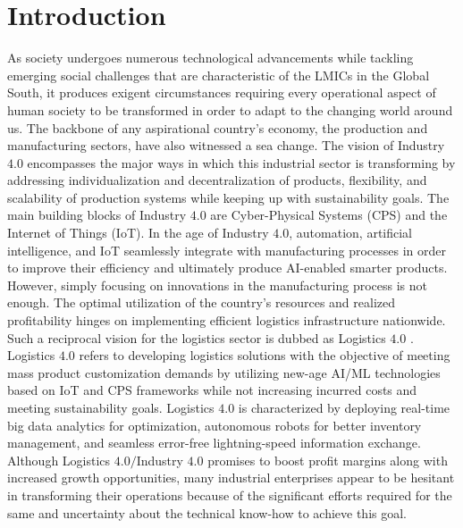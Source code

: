 \documentclass[paper=a4wide, fontsize=12pt]{scrartcl}	 %
\begin{document}
\section*{Introduction}

As society undergoes numerous technological advancements while tackling emerging social challenges that are characteristic of the LMICs in the Global South, it produces exigent circumstances requiring every operational aspect of human society to be transformed in order to adapt to the changing world around us. The backbone of any aspirational country's economy, the production and manufacturing sectors, have also witnessed a sea change. The vision of Industry $4.0$ encompasses the major ways in which this industrial sector is transforming by addressing individualization and decentralization of products, flexibility, and scalability of production systems while keeping up with sustainability goals. The main building blocks of Industry $4.0$ are Cyber-Physical Systems (CPS) and the Internet of Things (IoT). In the age of Industry $4.0$, automation, artificial intelligence, and IoT seamlessly integrate with manufacturing processes in order to improve their efficiency and ultimately produce AI-enabled smarter products. \\

However, simply focusing on innovations in the manufacturing process is not enough. The optimal utilization of the country's resources and realized profitability hinges on implementing efficient logistics infrastructure nationwide. Such a reciprocal vision for the logistics sector is dubbed as Logistics $4.0$ \cite{Winkelhaus2019}. Logistics $4.0$ refers to developing logistics solutions with the objective of meeting mass product customization demands by utilizing new-age AI/ML technologies based on IoT and CPS frameworks while not increasing incurred costs and meeting sustainability goals. Logistics $4.0$ is characterized by deploying real-time big data analytics for optimization, autonomous robots for better inventory management, and seamless error-free lightning-speed information exchange. Although Logistics $4.0/$Industry $4.0$ promises to boost profit margins along with increased growth opportunities, many industrial enterprises appear to be hesitant in transforming their operations because of the significant efforts required for the same and uncertainty about the technical know-how to achieve this goal. \\
\end{document}
